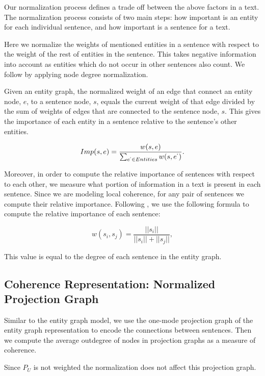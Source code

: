 Our normalization process defines a trade off between the above factors in a text.  
The normalization process consists of two main steps: how important is an entity for each individual sentence, and how important is a sentence for a text. 


Here we normalize the weights of mentioned entities in a sentence with respect to the weight of the rest of entities in the sentence. 
This takes negative information into account as entities which do not occur in other sentences also count. 
We follow  by applying node degree normalization. 

Given an entity graph, the normalized weight of an edge that connect an entity node, $e$, to a sentence node, $s$, equals the current weight of that edge divided by the sum of weights of edges that are connected to the sentence node, $s$. 
This gives the importance of each entity in a sentence relative to the sentence’s other entities.

\begin{equation}
Imp(s,e) = \frac{w(s,e)}{\sum_{e^{`}\in Entities}{w(s,e^{`})}}.
\end{equation} 

Moreover, in order to compute the relative importance of sentences with respect to each other, we measure what portion of information in a text is present in each sentence. 
Since we are modeling local coherence, for any pair of sentences we compute their relative importance. 
Following \cite{rode08}, we use the following formula to compute the relative importance of each sentence:

\begin{equation}
w(s_i, s_j) = \frac{||s_i||}{||s_i|| + ||s_j ||},
\end{equation}

This value is equal to the degree of each sentence in the entity graph.  

\subsection{Coherence Representation: Normalized Projection Graph}
%
Similar to the entity graph model, we use the one-mode projection graph of the entity graph representation to encode the connections between sentences. 
Then we compute the average outdegree of nodes in projection graphs as a measure of coherence. 

Since $P_U$ is not weighted the normalization does not affect this projection graph. 

